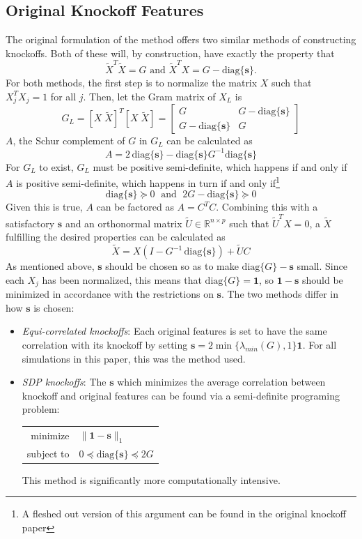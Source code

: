 \documentclass[11pt]{article}
\newcommand{\R}{\mathbb{R}}
\newcommand{\diag}[1]{\mathrm{diag}\{#1\}}
\theoremstyle{definition}
\begin{document}
\subsection{Original Knockoff Features}
    The original formulation of the method offers two similar methods of constructing knockoffs. Both of these will, by construction, have exactly the property that
    \[ \tilde X^T\tilde X=G \textrm{ and } \tilde X^T X = G - \diag{\mathbf s}.\]
    For both methods, the first step is to normalize the matrix $X$ such that $X_j^TX_j=1$ for all $j$. Then, let the Gram matrix of $X_L$ is
    \[ G_L= [X\; \tilde X]^T[X\; \tilde X] = \left[ \begin{array}{cc} G & G - \diag{\mathbf s} \\ G - \diag{\mathbf s} & G \end{array}\right] \]
    $A$, the Schur complement of $G$ in $G_L$ can be calculated as 
    \[ A = 2\,\diag{\mathbf s} - \diag{\mathbf s}G^{-1}\diag{\mathbf s} \]
    For $G_L$ to exist, $G_L$ must be positive semi-definite, which happens if and only if $A$ is positive semi-definite, which happens in turn if and only if\footnote{A fleshed out version of this argument can be found in the original knockoff paper} 
    \[ \diag{\mathbf s} \succeq 0  \; \textrm{ and } \; 2G - \diag{\mathbf s} \succeq 0 \]
    Given this is true, $A$ can be factored as $A=C^TC$. Combining this with a satisfactory $\mathbf s$ and an orthonormal matrix $\tilde U\in\R^{n\times p}$ such that $\tilde U^T X = 0$, a $\tilde X$ fulfilling the desired properties can be calculated as 
    \[ \tilde X = X(I-G^{-1}\,\diag{\mathbf s}) + \tilde UC\]
    As mentioned above, $\mathbf s$ should be chosen so as to make $\diag{G}-\mathbf s$ small. Since each $X_j$ has been normalized, this means that $\diag{G}=\mathbf 1$, so $\mathbf 1 - \mathbf s$ should be minimized in accordance with the restrictions on $\mathbf s$. The two methods differ in how $\mathbf s$ is chosen:
    \begin{itemize}
        \item \textit{Equi-correlated knockoffs}: Each original features is set to have the same correlation with its knockoff by setting $\mathbf s = 2\min\{\lambda_{min}(G),1\}\mathbf 1$. For all simulations in this paper, this was the method used.
        \item \textit{SDP knockoffs}: The $\mathbf s$ which minimizes the average correlation between knockoff and original features can be found via a semi-definite programing problem:
            \begin{center}
                \begin{tabular}{r l}
                    minimize & $\|\mathbf1-\mathbf s\|_1$ \\
                    subject to & $ 0 \preceq \diag{\mathbf s} \preceq 2G $
                \end{tabular} 
            \end{center}
            This method is significantly more computationally intensive. 
    \end{itemize}
     
\end{document}
